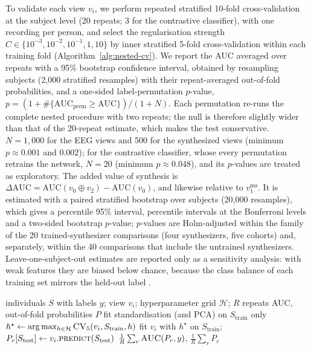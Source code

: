 \documentclass[10pt]{article}
\begin{document}
To validate each view $v_i$, we perform repeated stratified 10-fold cross-validation at the subject level (20 repeats; 3 for the contrastive classifier), with one recording per person, and select the regularisation strength $C \in \{10^{-3},10^{-2},10^{-1},1,10\}$ by inner stratified 5-fold cross-validation within each training fold (Algorithm~\ref{alg:nested-cv}). We report the AUC averaged over repeats with a 95\% bootstrap confidence interval, obtained by resampling subjects (2,000 stratified resamples) with their repeat-averaged out-of-fold probabilities, and a one-sided label-permutation $p$-value, $p=(1+\#\{\mathrm{AUC}_{\mathrm{perm}}\geq\mathrm{AUC}\})/(1+N)$. Each permutation re-runs the complete nested procedure with two repeats; the null is therefore slightly wider than that of the 20-repeat estimate, which makes the test conservative. $N=1{,}000$ for the EEG views and 500 for the synthesized views (minimum $p\approx0.001$ and $0.002$); for the contrastive classifier, whose every permutation retrains the network, $N=20$ (minimum $p\approx0.048$), and its $p$-values are treated as exploratory. The added value of synthesis is $\Delta\mathrm{AUC}=\mathrm{AUC}(v_0\oplus v_2)-\mathrm{AUC}(v_0)$, and likewise relative to $v_1^{\mathrm{ms}}$. It is estimated with a paired stratified bootstrap over subjects (20,000 resamples), which gives a percentile 95\% interval, percentile intervals at the Bonferroni levels and a two-sided bootstrap $p$-value; $p$-values are Holm-adjusted within the family of the 20 trained-synthesizer comparisons (four synthesizers, five cohorts) and, separately, within the 40 comparisons that include the untrained synthesizers. Leave-one-subject-out estimates are reported only as a sensitivity analysis: with weak features they are biased below chance, because the class balance of each training set mirrors the held-out label \cite{varoquaux2018}.

\begin{algorithm}[t]
\caption{Nested repeated cross-validation for view $v_i$}
\label{alg:nested-cv}
\begin{algorithmic}[1]
\Require individuals $S$ with labels $y$; view $v_i$; hyperparameter grid $\mathcal{H}$; $R$ repeats
\Ensure AUC, out-of-fold probabilities $P$
     
        \State fit standardisation (and PCA) on $S_{\text{train}}$ only
        \State $h^\star \gets \arg\max_{h \in \mathcal{H}} \textsc{CV}_5(v_i, S_{\text{train}}, h)$ 
        \State fit $v_i$ with $h^\star$ on $S_{\text{train}}$; $P_r[S_{\text{test}}] \gets v_i.\textsc{predict}(S_{\text{test}})$
    \EndFor
\EndFor
\State \Return $\frac{1}{R}\sum_r \textsc{AUC}(P_r, y)$, $\frac{1}{R}\sum_r P_r$
\end{algorithmic}
\end{algorithm}
\end{document}
